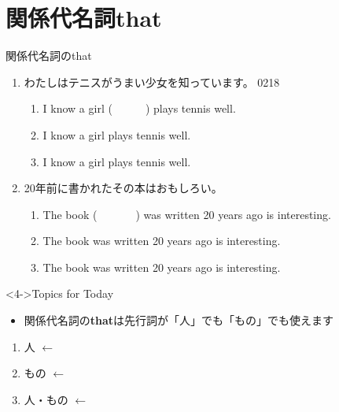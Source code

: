 \documentclass[aspectratio=169,xcolor={dvipsnames,table}]{beamer}
\begin{document}
\section{関係代名詞that }
\begin{frame}[plain,t]{関係代名詞のthat}
 \begin{enumerate}
  \item<1-> わたしはテニスがうまい少女を知っています。%
\hfill{\tiny 0218}\,{\scriptsize {}}
	\begin{enumerate}
	 \item<1-> I know a girl (~~~~~~) plays tennis well.
	 \item<2-> I know a girl  plays tennis well.
	 \item<5-> I know a girl  plays tennis well.
	\end{enumerate}
  \item<1-> 20年前に書かれたその本はおもしろい。
       \begin{enumerate}
	\item<1-> The book (~~~~~~~) was written 20 years ago is interesting.
	\item<3->  The book  was written 20 years ago is interesting.
	\item<6->  The book  was written 20 years ago is interesting.
       \end{enumerate}
 \end{enumerate}

\begin{block}<4->{Topics for Today}
\small
 

\begin{itemize}[square]
 \item<7-> 関係代名詞の\textbf{that}は先行詞が「人」でも「もの」でも使えます
\end{itemize}

\begin{enumerate}\small
 \item<4->  人\,\,$\longleftarrow$\,\,
 \item<4->  もの\,\,$\longleftarrow$\,\,
 \item<7->  人・もの\,\,$\longleftarrow$\,\,
 \end{enumerate}
     \end{block}

\end{frame}
\end{document}
